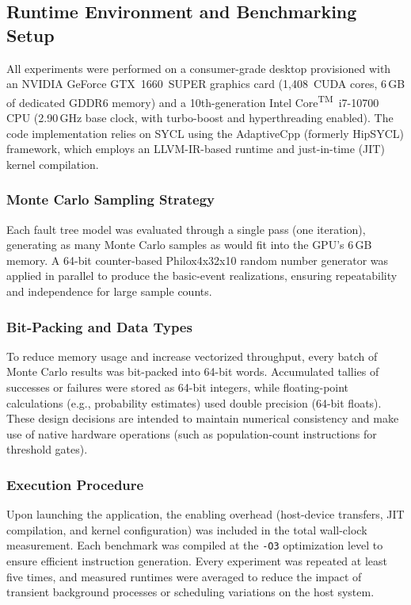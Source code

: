 \subsection{Runtime Environment and Benchmarking Setup}
\label{subsec:runtime_environment}

All experiments were performed on a consumer-grade desktop provisioned with an NVIDIA\textsuperscript{\textregistered} GeForce GTX~1660~SUPER graphics card (1{,}408~CUDA cores, 6\,GB of dedicated GDDR6 memory) and a 10th-generation Intel\textsuperscript{\textregistered} Core\textsuperscript{TM}~i7-10700 CPU (2.90\,GHz base clock, with turbo-boost and hyperthreading enabled). The code implementation relies on SYCL using the AdaptiveCpp (formerly HipSYCL) framework, which employs an LLVM-IR-based runtime and just-in-time (JIT) kernel compilation.

\subsubsection*{Monte Carlo Sampling Strategy}
Each fault tree model was evaluated through a single pass (one iteration), generating as many Monte Carlo samples as would fit into the GPU’s 6\,GB memory. A 64-bit counter-based Philox4x32x10 random number generator was applied in parallel to produce the basic-event realizations, ensuring repeatability and independence for large sample counts.

\subsubsection*{Bit-Packing and Data Types}
To reduce memory usage and increase vectorized throughput, every batch of Monte Carlo results was bit-packed into 64-bit words. Accumulated tallies of successes or failures were stored as 64-bit integers, while floating-point calculations (e.g., probability estimates) used double precision (64-bit floats). These design decisions are intended to maintain numerical consistency and make use of native hardware operations (such as population-count instructions for threshold gates).

\subsubsection*{Execution Procedure}
Upon launching the application, the enabling overhead (host-device transfers, JIT compilation, and kernel configuration) was included in the total wall-clock measurement. Each benchmark was compiled at the \texttt{-O3} optimization level to ensure efficient instruction generation. Every experiment was repeated at least five times, and measured runtimes were averaged to reduce the impact of transient background processes or scheduling variations on the host system.


